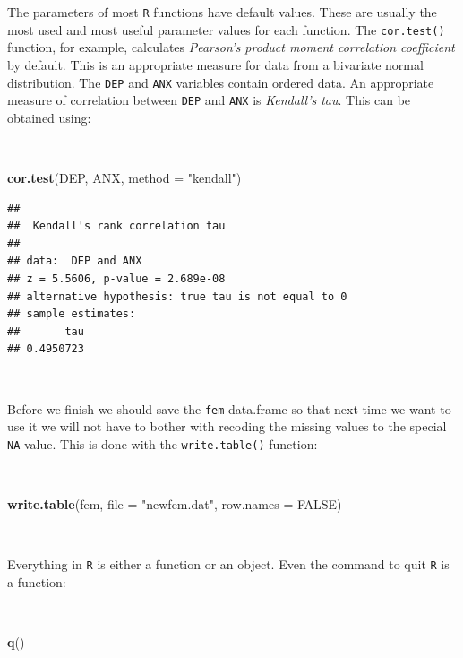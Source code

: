 \documentclass[12pt,a4paper]{book}
\newenvironment{Shaded}{\begin{snugshade}}{\end{snugshade}}
\newcommand{\DataTypeTok}[1]{\textcolor[rgb]{0.13,0.29,0.53}{#1}}
\newcommand{\KeywordTok}[1]{\textcolor[rgb]{0.13,0.29,0.53}{\textbf{#1}}}
\newcommand{\NormalTok}[1]{#1}
\newcommand{\OtherTok}[1]{\textcolor[rgb]{0.56,0.35,0.01}{#1}}
\newcommand{\StringTok}[1]{\textcolor[rgb]{0.31,0.60,0.02}{#1}}
\theoremstyle{definition}
\theoremstyle{definition}
\theoremstyle{definition}
\theoremstyle{remark}
\begin{document}
The parameters of most \texttt{R} functions have default values. These
are usually the most used and most useful parameter values for each
function. The \texttt{cor.test()} function, for example, calculates
\emph{Pearson's product moment correlation coefficient} by default. This
is an appropriate measure for data from a bivariate normal distribution.
The \texttt{DEP} and \texttt{ANX} variables contain ordered data. An
appropriate measure of correlation between \texttt{DEP} and \texttt{ANX}
is \emph{Kendall's tau}. This can be obtained using:

~

\begin{Shaded}
\begin{Highlighting}[]
\KeywordTok{cor.test}\NormalTok{(DEP, ANX, }\DataTypeTok{method =} \StringTok{"kendall"}\NormalTok{)}
\end{Highlighting}
\end{Shaded}

\begin{verbatim}
## 
##  Kendall's rank correlation tau
## 
## data:  DEP and ANX
## z = 5.5606, p-value = 2.689e-08
## alternative hypothesis: true tau is not equal to 0
## sample estimates:
##       tau 
## 0.4950723
\end{verbatim}

~

Before we finish we should save the \texttt{fem} data.frame so that next
time we want to use it we will not have to bother with recoding the
missing values to the special \texttt{NA} value. This is done with the
\texttt{write.table()} function:

~

\begin{Shaded}
\begin{Highlighting}[]
\KeywordTok{write.table}\NormalTok{(fem, }\DataTypeTok{file =} \StringTok{"newfem.dat"}\NormalTok{, }\DataTypeTok{row.names =} \OtherTok{FALSE}\NormalTok{)}
\end{Highlighting}
\end{Shaded}

~

Everything in \texttt{R} is either a function or an object. Even the
command to quit \texttt{R} is a function:

~

\begin{Shaded}
\begin{Highlighting}[]
\KeywordTok{q}\NormalTok{()}
\end{Highlighting}
\end{Shaded}
\end{document}
